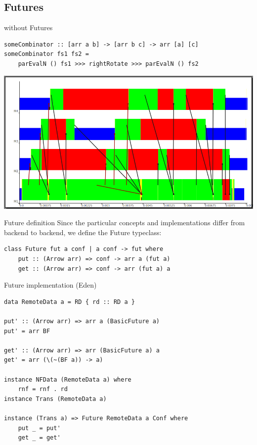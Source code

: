 \subsection{Futures}
\begin{frame}[fragile]{without Futures}
\begin{lstlisting}[frame=htrbl]
someCombinator :: [arr a b] -> [arr b c] -> arr [a] [c]
someCombinator fs1 fs2 =
	parEvalN () fs1 >>>	rightRotate >>>	parEvalN () fs2
\end{lstlisting}
\pause
\begin{center}
\includegraphics[scale=0.3]{images/withoutFutures}
\end{center}
\end{frame}
\begin{frame}[fragile]{Future definition}
Since the particular concepts and implementations differ from backend to backend, we define the Future typeclass:
\begin{lstlisting}[frame=htrbl]
class Future fut a conf | a conf -> fut where
    put :: (Arrow arr) => conf -> arr a (fut a)
    get :: (Arrow arr) => conf -> arr (fut a) a
\end{lstlisting}
\end{frame}
\begin{frame}[fragile]{Future implementation (Eden)}
\begin{lstlisting}[frame=htrbl]
data RemoteData a = RD { rd :: RD a }

put' :: (Arrow arr) => arr a (BasicFuture a)
put' = arr BF

get' :: (Arrow arr) => arr (BasicFuture a) a
get' = arr (\(~(BF a)) -> a)

instance NFData (RemoteData a) where
    rnf = rnf . rd
instance Trans (RemoteData a)

instance (Trans a) => Future RemoteData a Conf where
    put _ = put'
    get _ = get'
\end{lstlisting}
\end{frame}
